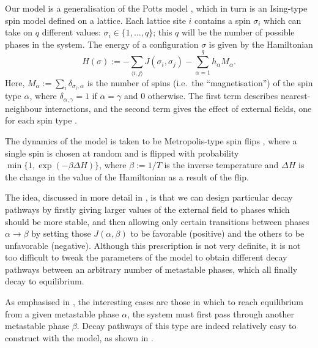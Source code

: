\documentclass[10pt]{article}
\newcommand{\J}[2]{J(#1, #2)}
\renewcommand{\ss}{\mathbf{\sigma}}
\newcommand{\s}{\sigma}
\newcommand{\defeq}{:=}
\renewcommand{\ss}{\sigma}
\renewcommand{\s}{\sigma}
\begin{document}
Our model is a generalisation of the 
Potts model \cite{Potts1952}, which in turn is an Ising-type spin model defined
on a lattice. Each lattice site $i$ contains a spin $\sigma_i$ which can take on
$q$ different values: $\sigma_i \in \{1,\ldots,q\}$; this $q$ will be the number
of possible phases in the system. The energy of a configuration $\ss$ is given by the Hamiltonian 
\begin{equation}\label{eq:hamiltonian}
H(\ss) 	\defeq -\sum_{\langle i, j \rangle} \J{\s_i}{\s_j} -
\sum_{\alpha=1}^q h_{\alpha} M_{\alpha}.
\end{equation}
Here, $M_{\alpha} \defeq \sum_{i} \delta_{\s_i,
\alpha}$
is the number of spins (i.e.\ the ``magnetisation'') of the
spin type $\alpha$, where 
$\delta_{\alpha, \gamma}=1$ if $\alpha = \gamma$ and
$0$ otherwise. 
The first term describes nearest-neighbour interactions, and the second term
gives the effect of external fields, one for each spin type \cite{SandersLarraldeLeyvrazCompetitiveNucleationPottsPRB2007}.


The dynamics of the model is taken to be Metropolis-type spin flips
\cite{NewmanBarkemaBook}, where a single spin is chosen at random and is
flipped with  probability $\min\{1,
\exp(-\beta \Delta H)\}$, where $\beta := 1/T$ is the inverse
temperature and $\Delta H$ is the change in the value of the Hamiltonian as a
result of the flip.


The idea, discussed in more detail in
\cite{SandersLarraldeLeyvrazCompetitiveNucleationPottsPRB2007}, is that we can
design particular decay pathways by firstly giving larger values of the
external field to phases which should be more stable, and then allowing only
certain transitions between phases $\alpha \to \beta$ by setting those
$\J{\alpha}{\beta}$ to be favorable (positive) and the others to be unfavorable
(negative). Although this prescription is not very definite, it is not too
difficult to tweak the parameters of the model to obtain different decay pathways
between an arbitrary number of metastable phases, which all finally decay to
equilibrium.

As emphasised in \cite{LarraldeLeyvrazSandersJStatMech2006}, the interesting
cases are those in which to reach equilibrium from a given metastable phase
$\alpha$, the system must first pass through another metastable phase $\beta$.
Decay pathways of this type are indeed relatively easy to construct with the model, as shown in
\cite{SandersLarraldeLeyvrazCompetitiveNucleationPottsPRB2007}.
\end{document}
